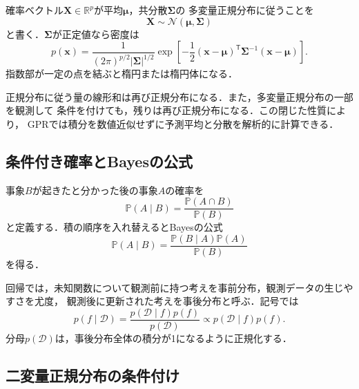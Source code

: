 \documentclass[a4paper,11pt]{ltjsarticle}
\newcommand{\Pp}{\mathbb P}
\newcommand{\R}{\mathbb R}
\newcommand{\N}{\mathcal N}
\newcommand{\D}{\mathcal D}
\newcommand{\T}{\mathsf T}
\begin{document}
確率ベクトル\(\bm X\in\R^p\)が平均\(\bm\mu\)，共分散\(\bm\Sigma\)の
多変量正規分布に従うことを
\begin{equation}
  \bm X\sim\N(\bm\mu,\bm\Sigma)
\end{equation}
と書く．\(\bm\Sigma\)が正定値なら密度は
\begin{equation}
  p(\bm x)
  =\frac{1}{(2\pi)^{p/2}|\bm\Sigma|^{1/2}}
  \exp\left[-\frac12
  (\bm x-\bm\mu)^\T\bm\Sigma^{-1}(\bm x-\bm\mu)
  \right].
  \label{eq:multivariate-normal-density}
\end{equation}
指数部が一定の点を結ぶと楕円または楕円体になる．

\begin{intuitionbox}[正規分布が便利な理由]
正規分布に従う量の線形和は再び正規分布になる．また，多変量正規分布の一部を観測して
条件を付けても，残りは再び正規分布になる．この閉じた性質により，
GPRでは積分を数値近似せずに予測平均と分散を解析的に計算できる．
\end{intuitionbox}

\subsection{条件付き確率とBayesの公式}

事象\(B\)が起きたと分かった後の事象\(A\)の確率を
\begin{equation}
  \Pp(A\mid B)
  =\frac{\Pp(A\cap B)}{\Pp(B)}
  \label{eq:conditional-probability}
\end{equation}
と定義する．積の順序を入れ替えるとBayesの公式
\begin{equation}
  \Pp(A\mid B)
  =\frac{\Pp(B\mid A)\Pp(A)}{\Pp(B)}
  \label{eq:bayes-rule}
\end{equation}
を得る．

回帰では，未知関数について観測前に持つ考えを事前分布，観測データの生じやすさを尤度，
観測後に更新された考えを事後分布と呼ぶ．記号では
\begin{equation}
  p(f\mid\D)
  =\frac{p(\D\mid f)p(f)}{p(\D)}
  \propto p(\D\mid f)p(f).
  \label{eq:bayes-function}
\end{equation}
分母\(p(\D)\)は，事後分布全体の積分が1になるように正規化する．

\subsection{二変量正規分布の条件付け}
\end{document}
